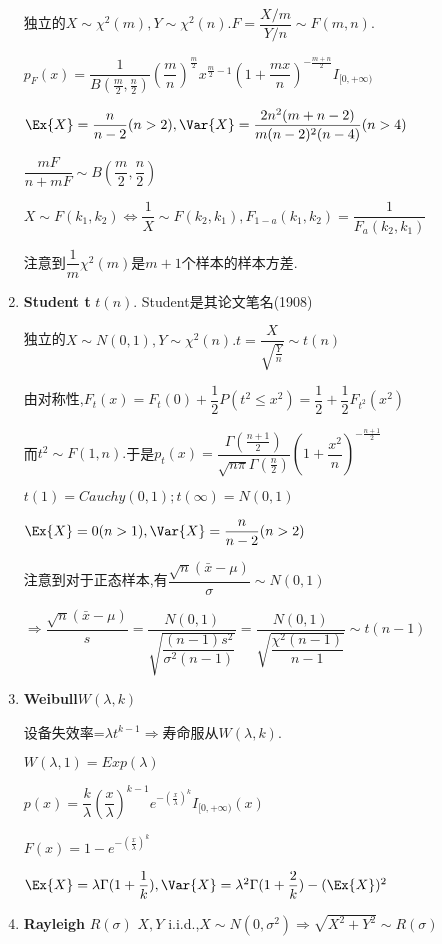 \begin{enumerate}
   独立的$X\sim \chi^2(m),Y\sim\chi^2(n).F=\dfrac{X/m}{Y/n}\sim F(m,n).$

   $ p_{F}(x) =
   \dfrac{1}{B(\frac{m}{2},\frac{n}{2})}(\dfrac{m}{n})^{\frac{m}{2}}x^{\frac{m}{2}-1}(1+\dfrac{mx}{n})^{-\frac{m+n}{2}} I_{[0,+\infty)}$

   $ \Ex{X} = \dfrac{n}{n-2}(n>2), \Var{X} = \dfrac{2n^2(m+n-2)}{m(n-2)^2(n-4)}(n>4)$

   $ \dfrac{mF}{n+mF} \sim B(\dfrac{m}{2},\dfrac{n}{2})$

   $ X\sim F(k_1,k_2) \Leftrightarrow \dfrac{1}{X}\sim F(k_2,k_1) , F_{1-a}(k_1,k_2) = \dfrac{1}{F_a(k_2,k_1)}$

     注意到$ \dfrac{1}{m}\chi^2(m)$是$ m+1$个样本的样本方差.

   \item \textbf{Student t} $ t(n)$. Student是其论文笔名(1908)

     独立的$X\sim N(0,1),Y\sim\chi^2(n).t=\dfrac{X}{\sqrt{\frac{Y}{n}}}\sim t(n) $

     由对称性,$ F_t(x)=F_t(0)+\dfrac{1}{2}P(t^2\le x^2)=\dfrac{1}{2}+\dfrac{1}{2}F_{t^2}(x^2)$

     而$ t^2\sim F(1,n).$于是$ p_t(x)=\dfrac{\Gamma(\frac{n+1}{2})}{\sqrt{n\pi}\Gamma(\frac{n}{2})}(1+\dfrac{x^2}{n})^{-\frac{n+1}{2}}$

     $t(1) = Cauchy(0,1) ;t(\infty)=N(0,1)$

     $ \Ex{X}=0(n>1), \Var{X}=\dfrac{n}{n-2}(n>2)$

     注意到对于正态样本,有$ \dfrac{\sqrt{n}(\bar{x}-\mu)}{\sigma}\sim N(0,1)$

     $ \Rightarrow \dfrac{\sqrt{n}(\bar{x}-\mu)}{s} =
   \dfrac{N(0,1)}{\sqrt{\dfrac{(n-1)s^2}{\sigma^2(n-1)}}} =
   \dfrac{N(0,1)}{\sqrt{\dfrac{\chi^2(n-1)}{n-1}}} \sim t(n-1)$
 \item \textbf{Weibull}$ W(\lambda,k)$

   设备失效率=$ \lambda t^{k-1}\Rightarrow  寿命服从W(\lambda,k). $

 $ W(\lambda,1) = Exp(\lambda)$

 $ p(x) = \dfrac{k}{\lambda}(\dfrac{x}{\lambda})^{k-1}e^{-(\frac{x}{\lambda})^k}I_{[0,+\infty)}(x)$

 $ F(x) = 1-e^{-(\frac{x}{\lambda})^k}$

 $ \Ex{X} = \lambda \Gamma(1+\dfrac{1}{k}), \Var{X} =
 \lambda^2\Gamma(1+\dfrac{2}{k})-(\Ex{X})^2$

\item \textbf{Rayleigh} $ R(\sigma)$
  $ X,Y$ i.i.d.,$ X\sim N(0, \sigma^2)\Rightarrow \sqrt{X^2+Y^2} \sim R(\sigma)$


\end{enumerate}
